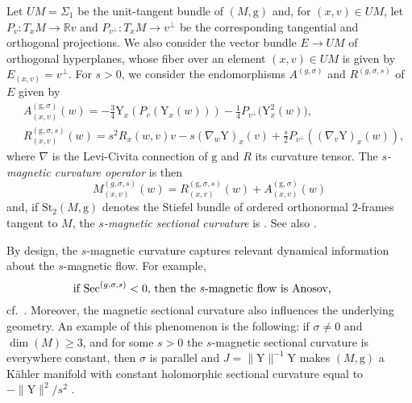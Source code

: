 \documentclass[pdftex]{sigma}
\newcommand{\g}{\mathrm{g}}
\newcommand{\Y}{\mathrm{Y}}
\numberwithin{equation}{section}
\theoremstyle{definition}
\begin{document}
Let $UM=\Sigma_1$ be the unit-tangent bundle of $(M,\g)$ and, for $(x,v)\in UM$, let ${P_v\colon T_xM \rightarrow \mathbb{R} v}$ and $P_{v^\perp}\colon T_xM \rightarrow v^\perp$ be the corresponding tangential and orthogonal projections. We also consider the vector bundle $E \rightarrow UM$ of orthogonal hyperplanes, whose fiber over an element $(x,v) \in UM$ is given by $E_{(x,v)} = v^\perp$. For $s > 0$, we consider the endomorphisms $A^{(g, \sigma)}$ and $R^{(g, \sigma, s)}$ of $E$ given by
\begin{equation}\label{R-and-A} \begin{split}
& A^{(\g,\sigma)}_{(x,v)}(w) = -\frac{3}{4} \Y_x(P_v(\Y_x(w))) - \frac{1}{4} P_{v^\perp}\bigl(\Y_x^2(w)\bigr), \\
& R^{(\g,\sigma,s)}_{(x,v)}(w) = s^2 R_x(w,v)v - s (\nabla_w \Y)_x(v) + \frac{s}{2} P_{v^\perp}((\nabla_v \Y)_x(w)),
\end{split} \end{equation}
where $\nabla$ is the Levi-Civita connection of $\g$ and $R$ its curvature tensor. The \emph{$s$-magnetic curvature operator} is then
\begin{equation*} M^{(g,\sigma,s)}_{(x,v)}(w) = R^{(\g,\sigma,s)}_{(x,v)}(w) + A^{(\g,\sigma)}_{(x,v)}(w)\end{equation*}and, if $\text{St}_2(M,\g)$ denotes the Stiefel bundle of ordered orthonormal $2$-frames tangent to $M$, the \emph{$s$-magnetic sectional curvature} \smash{$\text{Sec}^{(g,\sigma,s)} \colon \text{St}_2(M,\g) \rightarrow \mathbb{R}$} is \smash{$\text{Sec}^{(\g,\sigma,s)}_x(v,w) =\g_x\bigl(M^{(g,\sigma,s)}_{(x,v)}(w) , w\bigr)$}. See also \cite[Section 1.2]{assenza-imrn}.

By design, the $s$-magnetic curvature captures relevant dynamical information about the \mbox{$s$-magnetic} flow. For example, \begin{equation}\label{neg_sec_Anosov}
 \parbox{.7\textwidth}{if $\text{Sec}^{(g,\sigma,s)}<0$, then the $s$-magnetic flow is Anosov,}
\end{equation}cf.\
 \cite[Appendix A]{assenza2025magnetic}. Moreover, the magnetic sectional curvature also influences the underlying geometry. An example of this phenomenon is the following: if $\sigma \neq 0$ and $\dim(M) \geq 3$, and for some $s>0$ the $s$-magnetic sectional curvature is everywhere constant, then $\sigma$ is parallel and $J=\|\Y\|^{-1} \Y$ makes $(M,\g)$ a K\"ahler manifold with constant holomorphic sectional curvature equal to $-\|\Y\|^2/s^2$ \cite[Theorem D]{assenza2025magnetic}.
\end{document}

